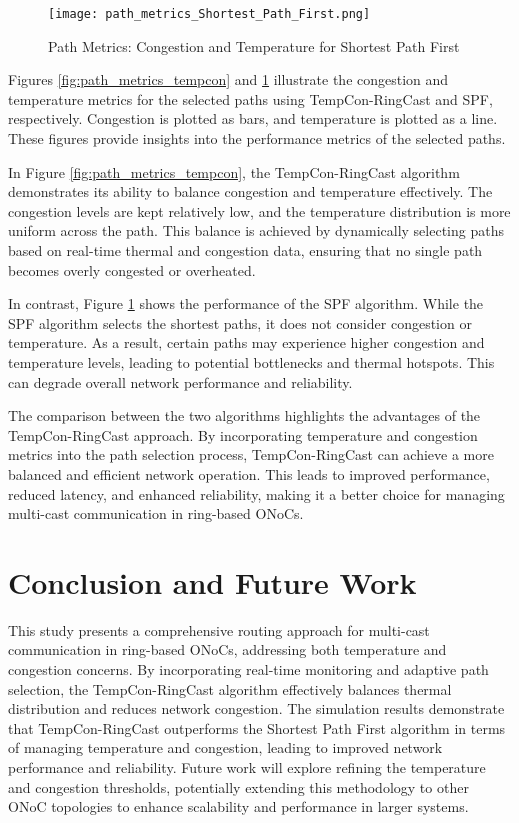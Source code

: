 \documentclass[conference]{IEEEtran}
\begin{document}
\begin{figure}[h]
    \centering
    \texttt{[image: path\_metrics\_Shortest\_Path\_First.png]}
    \caption{Path Metrics: Congestion and Temperature for Shortest Path First}
    \label{fig:path_metrics_spf}
\end{figure}

Figures \ref{fig:path_metrics_tempcon} and \ref{fig:path_metrics_spf} illustrate the congestion and temperature metrics for the selected paths using TempCon-RingCast and SPF, respectively. Congestion is plotted as bars, and temperature is plotted as a line. These figures provide insights into the performance metrics of the selected paths.

In Figure \ref{fig:path_metrics_tempcon}, the TempCon-RingCast algorithm demonstrates its ability to balance congestion and temperature effectively. The congestion levels are kept relatively low, and the temperature distribution is more uniform across the path. This balance is achieved by dynamically selecting paths based on real-time thermal and congestion data, ensuring that no single path becomes overly congested or overheated.

In contrast, Figure \ref{fig:path_metrics_spf} shows the performance of the SPF algorithm. While the SPF algorithm selects the shortest paths, it does not consider congestion or temperature. As a result, certain paths may experience higher congestion and temperature levels, leading to potential bottlenecks and thermal hotspots. This can degrade overall network performance and reliability.

The comparison between the two algorithms highlights the advantages of the TempCon-RingCast approach. By incorporating temperature and congestion metrics into the path selection process, TempCon-RingCast can achieve a more balanced and efficient network operation. This leads to improved performance, reduced latency, and enhanced reliability, making it a better choice for managing multi-cast communication in ring-based ONoCs.

\section{Conclusion and Future Work}
This study presents a comprehensive routing approach for multi-cast communication in ring-based ONoCs, addressing both temperature and congestion concerns. By incorporating real-time monitoring and adaptive path selection, the TempCon-RingCast algorithm effectively balances thermal distribution and reduces network congestion. The simulation results demonstrate that TempCon-RingCast outperforms the Shortest Path First algorithm in terms of managing temperature and congestion, leading to improved network performance and reliability. Future work will explore refining the temperature and congestion thresholds, potentially extending this methodology to other ONoC topologies to enhance scalability and performance in larger systems.
\end{document}
